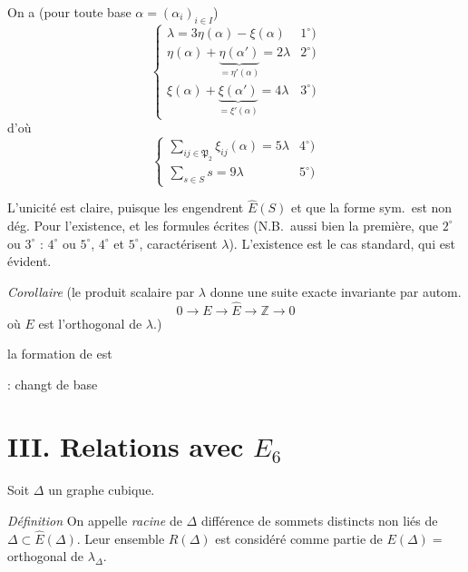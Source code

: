 \documentclass[11pt,a4paper]{article}
\begin{document}
On a  (pour toute base $\alpha =
(\alpha_i)_{i \in I}$)
\[
\begin{cases}
\lambda = 3\eta(\alpha) - \xi(\alpha) & 1^\circ) \\
\eta(\alpha) + \underbrace{\eta(\alpha')}_{= \eta'(\alpha)} = 2\lambda & 2^\circ) \\
\xi(\alpha) + \underbrace{\xi(\alpha')}_{= \xi'(\alpha)} = 4\lambda & 3^\circ)
\end{cases}
\]
d'où
\[
\begin{cases}
\sum_{ij \in \mathfrak{P}_2} \xi_{ij}(\alpha) = 5\lambda & 4^\circ) \\
\sum_{s \in S} s = 9\lambda & 5^\circ)
\end{cases}
\]

L'unicité est claire, puisque les  engendrent
$\widehat{E}(S)$ et que la forme sym.\ est non dég. Pour l'existence, et les
 formules écrites (N.B.\ aussi bien la première, que
 $2^\circ$ ou $3^\circ$  : $4^\circ$ ou
$5^\circ$, \struck{\ill{}} \add{\ill{}} $4^\circ$ et $5^\circ$, caractérisent
$\lambda$). L'existence est   le cas
standard, qui est évident.

\emph{Corollaire} (le produit scalaire par $\lambda$ donne une suite exacte
invariante par autom.
\[
0 \to E \to \widehat{E} \to \mathbb{Z} \to 0
\]
où $E$ est l'orthogonal de $\lambda$.)

 la formation de \ill{} est \ill{}

 : \ill{} changt de base

\section{III. Relations avec $E_6$}

Soit $\Delta$ un graphe cubique.

\emph{Définition} On appelle \emph{racine} de $\Delta$ \struck{\ill{}}
différence  de sommets distincts non liés
 de $\Delta \subset \widehat{E}(\Delta)$. Leur ensemble
$R(\Delta)$ est considéré comme partie de $E(\Delta) =$ orthogonal de
$\lambda_\Delta$.
\end{document}
